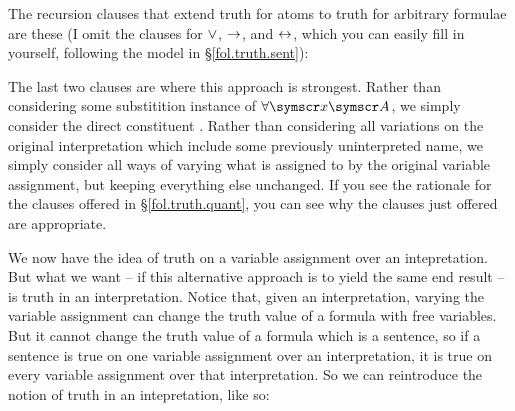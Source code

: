 The recursion clauses that extend truth for atoms to truth for arbitrary formulae are these (I omit the clauses for $\vee$, $\rightarrow$, and $\leftrightarrow$, which you can easily fill in yourself, following the model in §\ref{fol.truth.sent}): 

The last two clauses are where this approach is strongest. Rather than considering some substitition instance of $\forall\meta{x}\meta{A}$, we simply consider the direct constituent . Rather than considering all variations on the original interpretation which include some previously uninterpreted name, we simply consider all ways of varying what is assigned to  by the original variable assignment, but keeping everything else unchanged. If you see the rationale for the clauses offered in §\ref{fol.truth.quant}, you can see why the clauses just offered are appropriate.

We now have the idea of truth on a variable assignment over an intepretation. But what we want – if this alternative approach is to yield the same end result – is truth in an interpretation. Notice that, given an interpretation, varying the variable assignment can change the truth value of a formula with free variables. But it cannot change the truth value of a formula which is a sentence, so if a sentence is true on one variable assignment over an interpretation, it is true on every variable assignment over that interpretation. So we can reintroduce the notion of truth in an intepretation, like so:  

